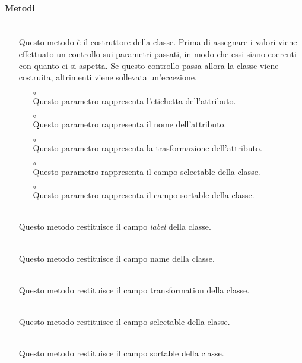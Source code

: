 \paragraph*{Metodi}
\begin{itemize}
\item[]  \\ Questo metodo è il costruttore della classe. Prima di assegnare i valori viene effettuato un controllo sui parametri passati, in modo che essi siano coerenti con quanto ci si aspetta. Se questo controllo passa allora la classe viene costruita, altrimenti viene sollevata un'eccezione.
\begin{itemize}\addtolength{\itemsep}{-0.5\baselineskip}
\item[$\circ$]  \\ Questo parametro rappresenta l'etichetta dell'attributo.
\item[$\circ$]  \\ Questo parametro rappresenta il nome dell'attributo.
\item[$\circ$]  \\ Questo parametro rappresenta la trasformazione dell'attributo.
\item[$\circ$]  \\ Questo parametro rappresenta il campo selectable della classe.
\item[$\circ$]  \\ Questo parametro rappresenta il campo sortable della classe.
\end{itemize}
\item[]  \\ Questo metodo restituisce il campo \textit{label} della classe.
\item[]  \\ Questo metodo restituisce il campo name della classe.
\item[]  \\ Questo metodo restituisce il campo transformation della classe.
\item[]  \\ Questo metodo restituisce il campo selectable della classe.
\item[]  \\ Questo metodo restituisce il campo sortable della classe.
\end{itemize}

